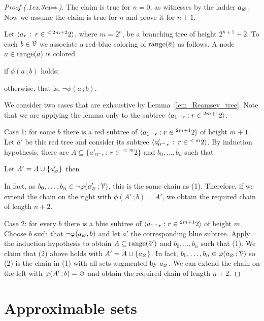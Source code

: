 \documentclass[scombinatorics.tex]{subfiles}
\begin{document}
\begin{proof}[Proof (\kern.1ex\kern.3ex\boldmath$\Rightarrow$)]
  The claim is true for $n=0$, as witnesses by the ladder $a_\varnothing$.
  Now we assume the claim is true for $n$ and prove it for $n+1$.

  Let $\langle a_r\, :\, r\in{}^{<\, 2m+2}2\rangle$, where $m=2^n$, be a branching tree of height $2^{n+1}+2$.
  To each $b\in\EuScript V$ we associate a red-blue coloring of $\mathop{\rm range}(\bar a)$ as follows.
  A node $a\in\mathop{\rm range}(\bar a)$ is colored
  
  \qquad\qquad {}\qquad if $\phi(a\,;b)$ holds;
  
  \qquad\qquad {}\qquad otherwise, that is, $\neg\phi(a\,;b)$.
  
  We consider two cases that are exhaustive by Lemma~\ref{lem_Reamsey_tree}.
  Note that we are applying the lemma only to the subtree $\langle a_{1^\frown r}:r\in{}^{2m+1}2\rangle$.

  Case 1: for some $b$ there is a red subtree of $\langle a_{1^\frown r}:r\in{}^{2m+1}2\rangle$ of height $m+1$.
  Let $\bar a'$ be this red tree and consider its subtree $\langle a'_{0^\frown r}\,:\,r\in {}^{<\,m}2\rangle$.
  By induction hypothesis, there are $A\subseteq\{a'_{0^\frown r}\,:\,r\in {}^{<\,m}2\}$ and $b_0,\dots,b_n$ such that


  Let $A'=A\cup\{a'_\varnothing\}$ then


  In fact, as $b_0,\dots,b_n\in\neg\varphi(a'_\varnothing\,;\EuScript V)$, this is the same chain as (1).
  Therefore, if we extend the chain on the right with $\phi(A'\,;b)=A'$, we obtain the required chain of length $n+2$.
  
  Case 2: for every $b$ there is a blue subtree of $\langle a_{1^\frown r}:r\in{}^{2m+1}2\rangle$ of height $m$.
  Choose $b$ such that $\neg\varphi(a_\varnothing, b)$ and let $\bar a'$ the corresponding blue subtree.
  Apply the induction hypothesis to obtain $A\subseteq\mathop{\rm range}(\bar a')$ and $b_0,\dots,b_n$ such that (1).
  We claim that (2) above holds with $A'=A\cup\{a_\varnothing\}$.
  In fact, $b_0,\dots,b_n\in\varphi(a_\varnothing\,;\EuScript V)$ so (2) is the chain in (1) with all sets augmented by $a_\varnothing$.
  We can extend the chain on the left with $\varphi(A'\,;b)=\varnothing$ and obtain the required chain of length $n+2$.
\end{proof}


\section{Approximable sets}
\end{document}
